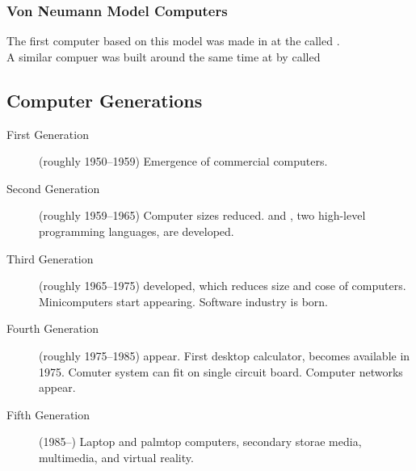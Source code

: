 \documentclass[\main/notes.tex]{subfiles}
\begin{document}
				\subsubsection{Von Neumann Model Computers}
					The first computer based on this model was made in  at the  called .\\
					A similar compuer was built around the same time at  by  called 
			\pagebreak
			\subsection{Computer Generations}
				\begin{description}
					\item[First Generation] (roughly 1950--1959) Emergence of commercial computers.
					\item[Second Generation] (roughly 1959--1965) Computer sizes reduced.  and , two high-level programming languages, are developed.
					\item[Third Generation] (roughly 1965--1975)  developed, which reduces size and cose of computers. Minicomputers start appearing. Software industry is born.
					\item[Fourth Generation] (roughly 1975--1985)  appear. First desktop calculator,  becomes available in 1975. Comuter system can fit on single circuit board. Computer networks appear.
					\item[Fifth Generation] (1985--) Laptop and palmtop computers, secondary storae media, multimedia, and virtual reality.
				\end{description}
\end{document}
